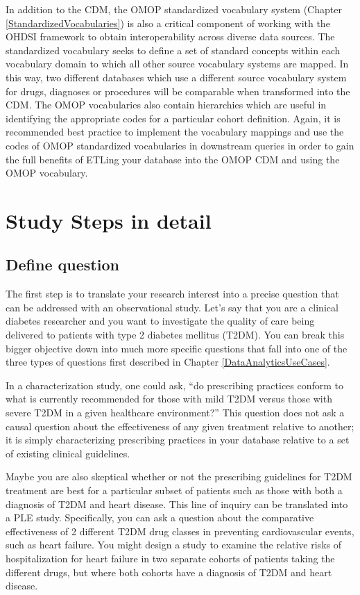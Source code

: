 \documentclass[11pt]{book}
\theoremstyle{definition}
\theoremstyle{definition}
\theoremstyle{definition}
\theoremstyle{remark}
\begin{document}
In addition to the CDM, the OMOP standardized vocabulary system (Chapter \ref{StandardizedVocabularies}) is also a critical component of working with the OHDSI framework to obtain interoperability across diverse data sources. The standardized vocabulary seeks to define a set of standard concepts within each vocabulary domain to which all other source vocabulary systems are mapped. In this way, two different databases which use a different source vocabulary system for drugs, diagnoses or procedures will be comparable when transformed into the CDM. The OMOP vocabularies also contain hierarchies which are useful in identifying the appropriate codes for a particular cohort definition. Again, it is recommended best practice to implement the vocabulary mappings and use the codes of OMOP standardized vocabularies in downstream queries in order to gain the full benefits of ETLing your database into the OMOP CDM and using the OMOP vocabulary.

\hypertarget{study-steps-in-detail}{%
\section{Study Steps in detail}\label{study-steps-in-detail}}

\hypertarget{define-question}{%
\subsection{Define question}\label{define-question}}

The first step is to translate your research interest into a precise question that can be addressed with an observational study. Let's say that you are a clinical diabetes researcher and you want to investigate the quality of care being delivered to patients with type 2 diabetes mellitus (T2DM). You can break this bigger objective down into much more specific questions that fall into one of the three types of questions first described in Chapter \ref{DataAnalyticsUseCases}.

In a characterization study, one could ask, ``do prescribing practices conform to what is currently recommended for those with mild T2DM versus those with severe T2DM in a given healthcare environment?'' This question does not ask a causal question about the effectiveness of any given treatment relative to another; it is simply characterizing prescribing practices in your database relative to a set of existing clinical guidelines.

Maybe you are also skeptical whether or not the prescribing guidelines for T2DM treatment are best for a particular subset of patients such as those with both a diagnosis of T2DM and heart disease. This line of inquiry can be translated into a PLE study. Specifically, you can ask a question about the comparative effectiveness of 2 different T2DM drug classes in preventing cardiovascular events, such as heart failure. You might design a study to examine the relative risks of hospitalization for heart failure in two separate cohorts of patients taking the different drugs, but where both cohorts have a diagnosis of T2DM and heart disease.
\end{document}
